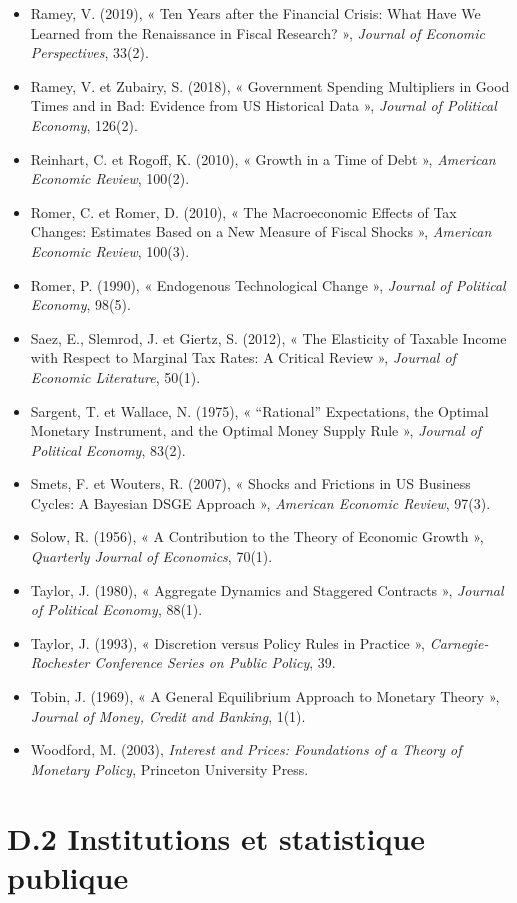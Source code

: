 \documentclass[
  11pt,
  11pt,
  a4paper,
  openany]{book}
\begin{document}
\begin{itemize}
\item
  Ramey, V. (2019), « Ten Years after the Financial Crisis: What Have We
  Learned from the Renaissance in Fiscal Research? », \emph{Journal of
  Economic Perspectives}, 33(2).
\item
  Ramey, V. et Zubairy, S. (2018), « Government Spending Multipliers in
  Good Times and in Bad: Evidence from US Historical Data »,
  \emph{Journal of Political Economy}, 126(2).
\item
  Reinhart, C. et Rogoff, K. (2010), « Growth in a Time of Debt »,
  \emph{American Economic Review}, 100(2).
\item
  Romer, C. et Romer, D. (2010), « The Macroeconomic Effects of Tax
  Changes: Estimates Based on a New Measure of Fiscal Shocks »,
  \emph{American Economic Review}, 100(3).
\item
  Romer, P. (1990), « Endogenous Technological Change », \emph{Journal
  of Political Economy}, 98(5).
\item
  Saez, E., Slemrod, J. et Giertz, S. (2012), « The Elasticity of
  Taxable Income with Respect to Marginal Tax Rates: A Critical Review
  », \emph{Journal of Economic Literature}, 50(1).
\item
  Sargent, T. et Wallace, N. (1975), « ``Rational'' Expectations, the
  Optimal Monetary Instrument, and the Optimal Money Supply Rule »,
  \emph{Journal of Political Economy}, 83(2).
\item
  Smets, F. et Wouters, R. (2007), « Shocks and Frictions in US Business
  Cycles: A Bayesian DSGE Approach », \emph{American Economic Review},
  97(3).
\item
  Solow, R. (1956), « A Contribution to the Theory of Economic Growth »,
  \emph{Quarterly Journal of Economics}, 70(1).
\item
  Taylor, J. (1980), « Aggregate Dynamics and Staggered Contracts »,
  \emph{Journal of Political Economy}, 88(1).
\item
  Taylor, J. (1993), « Discretion versus Policy Rules in Practice »,
  \emph{Carnegie-Rochester Conference Series on Public Policy}, 39.
\item
  Tobin, J. (1969), « A General Equilibrium Approach to Monetary Theory
  », \emph{Journal of Money, Credit and Banking}, 1(1).
\item
  Woodford, M. (2003), \emph{Interest and Prices: Foundations of a
  Theory of Monetary Policy}, Princeton University Press.
\end{itemize}

\hypertarget{d.2-institutions-et-statistique-publique}{%
\section{D.2 Institutions et statistique
publique}\label{d.2-institutions-et-statistique-publique}}
\end{document}
